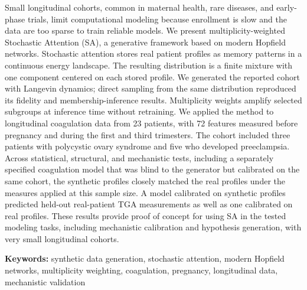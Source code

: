 Small longitudinal cohorts, common in maternal health, rare diseases, and early-phase trials,
limit computational modeling because enrollment is slow and the data are too sparse to train
reliable models. We present multiplicity-weighted Stochastic Attention (SA), a generative
framework based on modern Hopfield networks. Stochastic attention stores real patient profiles
as memory patterns in a continuous energy landscape. The resulting distribution is a
finite mixture with one component centered on each stored profile. We generated the reported
cohort with Langevin dynamics; direct sampling from the same distribution reproduced its
fidelity and membership-inference results. Multiplicity weights amplify selected subgroups at
inference time without retraining. We applied the method to longitudinal coagulation data from
23 patients, with 72 features measured before pregnancy and during the first and third
trimesters. The cohort included three patients with polycystic ovary syndrome and five who
developed preeclampsia. Across statistical, structural, and mechanistic tests, including
a separately specified coagulation model that was blind to the generator but calibrated
on the same cohort, the synthetic profiles closely matched the real profiles under the
measures applied at this sample size. A model calibrated on synthetic profiles predicted
held-out real-patient TGA measurements as well as one calibrated on real profiles. These
results provide proof of concept for using SA in the tested modeling tasks, including
mechanistic calibration and hypothesis generation, with very small longitudinal cohorts.

\medskip
\noindent\textbf{Keywords:} synthetic data generation, stochastic attention, modern Hopfield networks,
multiplicity weighting, coagulation, pregnancy, longitudinal data, mechanistic validation
